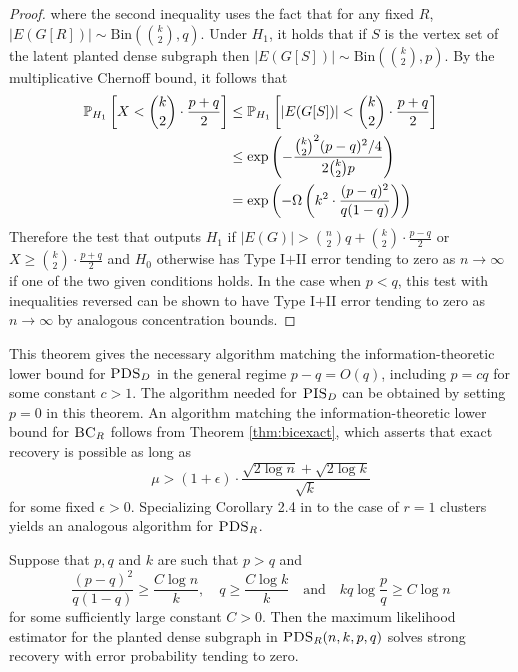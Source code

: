 \begin{proof}
where the second inequality uses the fact that for any fixed $R$, $\left|E\left(G[R]\right)\right| \sim \text{Bin}(\binom{k}{2}, q)$. Under $H_1$, it holds that if $S$ is the vertex set of the latent planted dense subgraph then $|E(G[S])| \sim \text{Bin}(\binom{k}{2}, p)$. By the multiplicative Chernoff bound, it follows that
\begin{align*}
\mathbb{P}_{H_1}\left[X < \binom{k}{2} \cdot \frac{p + q}{2} \right] &\le \mathbb{P}_{H_1}\left[|E(G[S])| < \binom{k}{2} \cdot \frac{p + q}{2} \right] \\
&\le \exp\left( - \frac{\binom{k}{2}^2 (p - q)^2/4}{2\binom{k}{2} p} \right) \\
&= \exp\left( - \Omega\left( k^2 \cdot \frac{(p-q)^2}{q(1 - q)} \right) \right)
\end{align*}
Therefore the test that outputs $H_1$ if $|E(G)| > \binom{n}{2} q + \binom{k}{2} \cdot \frac{p - q}{2}$ or $X \ge \binom{k}{2} \cdot \frac{p + q}{2}$ and $H_0$ otherwise has Type I$+$II error tending to zero as $n \to \infty$ if one of the two given conditions holds. In the case when $p < q$, this test with inequalities reversed can be shown to have Type I$+$II error tending to zero as $n \to \infty$ by analogous concentration bounds.
\end{proof}

This theorem gives the necessary algorithm matching the information-theoretic lower bound for $\textsc{PDS}_D$ in the general regime $p - q = O(q)$, including $p = cq$ for some constant $c > 1$. The algorithm needed for $\textsc{PIS}_D$ can be obtained by setting $p = 0$ in this theorem. An algorithm matching the information-theoretic lower bound for $\textsc{BC}_R$ follows from Theorem \ref{thm:bicexact}, which asserts that exact recovery is possible as long as
$$\mu > (1 + \epsilon) \cdot \frac{\sqrt{2\log n} + \sqrt{2 \log k}}{\sqrt{k}}$$
for some fixed $\epsilon > 0$. Specializing Corollary 2.4 in \cite{chen2016statistical} to the case of $r = 1$ clusters yields an analogous algorithm for $\textsc{PDS}_R$.

\begin{theorem}
Suppose that $p, q$ and $k$ are such that $p > q$ and
$$\frac{(p - q)^2}{q(1 - q)} \ge \frac{C\log n}{k}, \quad q \ge \frac{C\log k}{k} \quad \text{and} \quad kq \log \frac{p}{q} \ge C \log n$$
for some sufficiently large constant $C > 0$. Then the maximum likelihood estimator for the planted dense subgraph in $\textsc{PDS}_R(n, k, p, q)$ solves strong recovery with error probability tending to zero.
\end{theorem}

